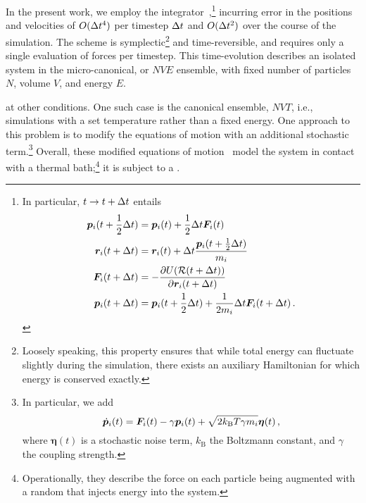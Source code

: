 In the present work, we employ the  integrator~\cite{v1967p},\footnote[][-2\baselineskip]{
	In particular, $t\rightarrow t+\Delta t$ entails~\cite{tuckerman2010}
	\begin{align*}
		\boldsymbol{p}_i(t+\frac{1}{2} \Delta t) &= \boldsymbol{p}_i(t) + \frac{1}{2} \Delta t \boldsymbol{F}_i(t) \\
		\boldsymbol{r}_i(t+\Delta t) &= \boldsymbol{r}_i(t) + \Delta t \frac{\boldsymbol{p}_i(t+\frac{1}{2} \Delta t)}{m_i} \\
		\boldsymbol{F}_i(t+\Delta t) &= - \frac{\partial U(\mathcal{R}(t+\Delta t))}{\partial \boldsymbol{r}_i(t+\Delta t)} \\
		\boldsymbol{p}_i(t+\Delta t) &= \boldsymbol{p}_i(t+\frac{1}{2} \Delta t) + \frac{1}{2 m_i} \Delta t \boldsymbol{F}_i(t+\Delta t) \, .
	\end{align*}
} incurring error in the positions and velocities of $O(\Delta t^4)$ per timestep $\Delta t$ and $O(\Delta t^2)$ over the course of the simulation. The scheme is symplectic\footnote{Loosely speaking, this property ensures that while total energy can fluctuate slightly during the simulation, there exists an auxiliary Hamiltonian for which energy is conserved exactly.
} and time-reversible, and requires only a single evaluation of forces per timestep.
This time-evolution describes an isolated system in the micro-canonical, or $NVE$ ensemble, with fixed number of particles $N$, volume $V$, and energy $E$.


 at other conditions. One such case is the canonical ensemble, $NVT$, i.e., simulations with a set temperature rather than a fixed energy. One approach to this problem is to modify the equations of motion with an additional stochastic term.\footnote{In particular, we add
\begin{equation*}
	\dot {\boldsymbol{p}}_i(t) = \boldsymbol{F}_i(t) - \gamma \boldsymbol{p}_i(t) + \sqrt{2 k_{\text{B}} T \gamma m_i} \boldsymbol{\eta}(t) \, ,
\end{equation*}
where $\boldsymbol{\eta}(t)$ is a stochastic noise term, $k_{\text{B}}$ the Boltzmann constant, and $\gamma$ the coupling strength.
} Overall, these modified  equations of motion~\cite{ss1978p} model the system in contact with a thermal bath;\footnote{Operationally, they describe the force on each particle being augmented with a random  that injects energy into the system.} it is subject to a .

